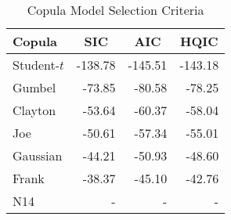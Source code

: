 \begin{table}[htbp]
\centering
\caption{Copula Model Selection Criteria}
\begin{tabular}{lrrr}
\hline
Copula & \multicolumn{1}{c}{SIC} & \multicolumn{1}{c}{AIC} & \multicolumn{1}{c}{HQIC} \\
\hline
Student-$t$ & -138.78 & -145.51 & -143.18 \\
Gumbel & -73.85 & -80.58 & -78.25 \\
Clayton & -53.64 & -60.37 & -58.04 \\
Joe & -50.61 & -57.34 & -55.01 \\
Gaussian & -44.21 & -50.93 & -48.60 \\
Frank & -38.37 & -45.10 & -42.76 \\
N14 & - & - & - \\
\hline
\end{tabular}
\label{tab:copula_selection}
\end{table}
